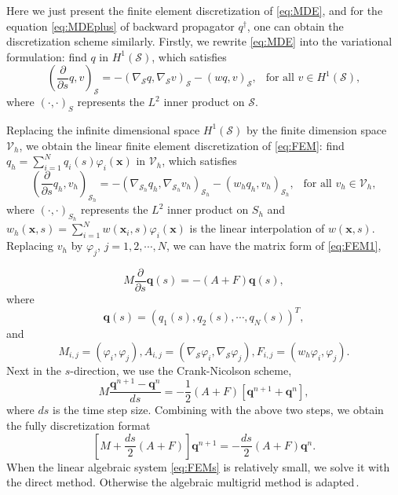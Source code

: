 \documentclass[final,1p,times]{elsarticle}
\newcommand{\bx}{\mathbf{x}}
\newcommand{\calS}{\mathcal{S}}
\begin{document}
Here we just present the finite element discretization of \eqref{eq:MDE}, and
for the equation \eqref{eq:MDEplus} of backward propagator $q^{\dag}$, one can
obtain the discretization scheme similarly. Firstly, we rewrite \eqref{eq:MDE} into the variational
formulation: find $q$ in $H^1(\calS)$, which satisfies
\begin{equation}\label{eq:FEM}
    \left(\frac{\partial}{\partial s} q, v\right)_\calS = -(\nabla_\calS q,
    \nabla_\calS v)_\calS - (wq, v)_\calS, ~~\text{ for all } v\in H^1(\calS),
\end{equation}
where $(\cdot,\cdot)_S$ represents the $L^2$ inner product on
$\calS$. 

Replacing the infinite dimensional space $H^1(\calS)$ by the finite dimension space
$\mathcal V_h$, we obtain the linear finite element discretization of
\eqref{eq:FEM}: find $q_h=\sum_{i=1}^N q_i(s)\varphi_i(\bx)$ in
$\mathcal V_h$, which satisfies
\begin{equation}\label{eq:FEM1}
    \left(\frac{\partial}{\partial s} q_h, v_h\right)_{\calS_h} =
    -(\nabla_{\calS_h}
    q_h, \nabla_{\calS_h} v_h)_{\calS_h} - (w_hq_h, v_h)_{\calS_h},
    ~~\text{ for all } v_h\in \mathcal V_h, 
\end{equation}
where $(\cdot, \cdot)_{S_h}$ represents the $L^2$ inner product on $S_h$ and
$w_h(\bx, s)=\sum_{i=1}^N w(\bx_i, s)\varphi_i(\bx)$ is the linear interpolation of
$w(\bx, s)$.  Replacing $v_h$ by $\varphi_j$, $j=1, 2,
\cdots, N$, we can have the matrix form of \eqref{eq:FEM1}, 

\begin{equation}
    M\frac{\partial}{\partial s}\mathbf q(s) = - (A + F) \mathbf q(s), 
\end{equation}
where 
\begin{equation*}
    \mathbf q(s) = \left(q_1(s), q_2(s), \cdots, q_N(s)\right)^T, 
\end{equation*} 
and 
\begin{equation*}
    M_{i,j} = (\varphi_i, \varphi_j), A_{i, j} = (\nabla_\calS\varphi_i,
    \nabla_\calS\varphi_j), F_{i, j} = (w_h\varphi_i, \varphi_j).
\end{equation*}
Next in the $s$-direction, we use the Crank-Nicolson scheme,
\begin{equation}\label{eq:FEMs}
    M \frac{\mathbf q^{n+1} - \mathbf q^n}{d s} = - \frac{1}{2}(A + F)\left[\mathbf
    q^{n+1} + \mathbf q^{n}\right],
\end{equation}
where $d s$ is the time step size. Combining with the above two steps, we obtain the fully discretization
format
\begin{equation}\label{eq:FEMs}
    \left[M + \frac{ds}{2} (A+F)\right] \mathbf q^{n+1} = -
	\frac{ds}{2}(A + F)\mathbf{q}^{n}.
\end{equation}
When the linear algebraic system \eqref{eq:FEMs} is relatively
small, we solve it with the direct method. Otherwise the algebraic
multigrid method is adapted\,\cite{chenlong}.
\end{document}
